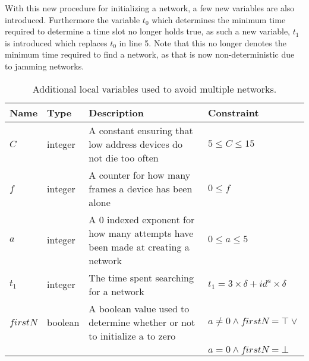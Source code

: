 With this new procedure for initializing a network, a few new variables are also introduced.
Furthermore the variable $t_0$ which determines the minimum time required to determine a time slot no longer holds true, as such a new variable, $t_1$ is introduced which replaces $t_0$ in  line 5.
Note that this no longer denotes the minimum time required to find a network, as that is now non-deterministic due to jamming networks.
\begin{table}[h]
    {\setlength{\extrarowheight}{1ex}%
    \begin{tabularx}{\textwidth}{l|l|X|l}
        \toprule
        Name                & Type      & Description & Constraint \\
        \midrule
        $C$                 & integer   & A constant ensuring that low address devices do not die too often                 & $5 \leq C \leq 15$      \\
        $f$                 & integer   & A counter for how many frames a device has been alone                             & $0 \leq f$  \\
        $a$                 & integer   & A 0 indexed exponent for how many attempts have been made at creating a network   & $0 \leq a \leq 5$     \\
        $t_1$               & integer   & The time spent searching for a network                                            & $t_1 = 3 \times \delta + id^a \times \delta$     \\
        $firstN$            & boolean   & A boolean value used to determine whether or not to initialize a to zero          & $a \neq 0 \land firstN = \top \lor$     \\
                            &           &                                                                                   & $a = 0 \land firstN = \bot$     \\

        \bottomrule
    \end{tabularx}}
    \caption{Additional local variables used to avoid multiple networks.}
    \label{tab:locals_wmulticonnect}
\end{table}